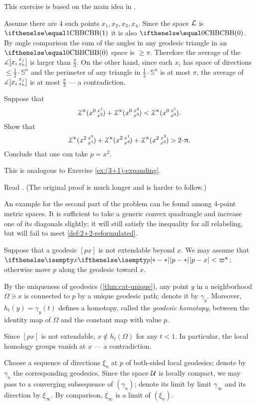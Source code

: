 This exercise is based on the main idea in \cite{hsiang-kleiner}.

\medskip

Assume there are 4 such points $x_1,x_2,x_3,x_4$.
Since the space $\mathcal{L}$ is $\Alex{1}$  it is also $\Alex{0}$. By angle comparison the sum of the angles in any geodesic triangle in an $\Alex{0}$ space is $\ge \pi$.
Therefore the average of the $\measuredangle[x_i\,{}^{x_j}_{x_k}]$ is  larger than $\tfrac\pi3$.
On the other hand, since each $x_i$ has space of directions $\le\tfrac12\cdot\mathbb{S}^n$ and the perimeter of any triangle in $\tfrac12\cdot\mathbb{S}^n$ is at most $\pi$, the average of $\measuredangle[x_i\,{}^{x_j}_{x_k}]$ is at most $\tfrac\pi3$ --- a contradiction.


Suppose that 
\[\angk\kappa {x^0}{x^1}{x^2}+\angk\kappa {x^0}{x^2}{x^3}<\angk\kappa {x^0}{x^1}{x^3}.\]
Show that
\[\angk\kappa {x^2}{x^0}{x^1}+\angk\kappa {x^2}{x^1}{x^3}+\angk\kappa {x^2}{x^3}{x^0}>2\cdot\pi.\]
Conclude that one can take $p=x^2$.

This is analogous to Exercise \ref{ex:(3+1)-expanding}.

 Read \cite{sato}. (The original proof \cite{berg-nikolaev} is much longer and is harder to follow.)

An example for the second part of the problem can be found among 4-point metric spaces.
It is sufficient to take a generic convex quadrangle and increase one of its diagonals slightly;
it will still satisfy the inequality for all relabeling, but will fail to meet \ref{def:2+2-reformulated}.

Suppose that a geodesic $[px]$ is not extendable beyond $x$.
We may assume that $\dist{p}{x}{}<\varpi\kappa$;
otherwise move $p$ along the geodesic toward  $x$.

By the uniqueness of geodesics (\ref{thm:cat-unique}), any point $y$ in a neighborhood $\Omega\ni x$ is connected to $p$ by a unique geodesic path; denote it by $\gamma_y$.
Moreover, $h_t(y)=\gamma_y(t)$ defines a homotopy, called the  \emph{geodesic homotopy}, between the identity map of $\Omega$ and the constant map with value $p$.

Since $[px]$ is not extendable, $x\notin h_t(\Omega)$ for any $t<1$.
In particular, the local homology groups vanish at $x$ --- a contradiction.

 Choose a sequence of 
directions $\xi_n$ at $p$
of both-sided local geodesics; denote by $\gamma_n$ the corresponding geodesics.
Since the space $\mathcal{U}$ is locally compact, we may pass to a converging subsequence of $(\gamma_n)$; denote its limit by limit $\gamma_\infty$ and its direction by $\xi_\infty$.
By comparison, $\xi_\infty$ is a limit of $(\xi_n)$.

